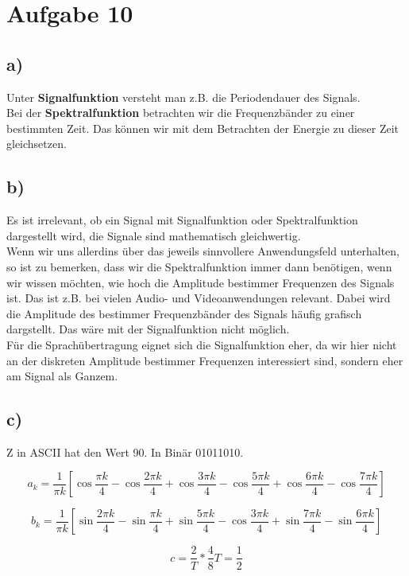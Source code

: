\documentclass[a4paper,12pt]{scrartcl}
\begin{document}
\section{Aufgabe 10}
\subsection{a)}
Unter \textbf{Signalfunktion} versteht man z.B. die
Periodendauer des Signals.\\
Bei der \textbf{Spektralfunktion} betrachten wir
die Frequenzbänder zu einer bestimmten Zeit. Das
können wir mit dem Betrachten der Energie zu dieser
Zeit gleichsetzen.

\subsection{b)}
Es ist irrelevant, ob ein Signal mit Signalfunktion oder Spektralfunktion
dargestellt wird, die Signale sind mathematisch gleichwertig.\\

Wenn wir uns allerdins über das jeweils sinnvollere Anwendungsfeld unterhalten,
so ist zu bemerken, dass wir die Spektralfunktion immer dann benötigen,
wenn wir wissen möchten, wie hoch die Amplitude bestimmer Frequenzen des
Signals ist. Das ist z.B. bei vielen Audio- und Videoanwendungen relevant.
Dabei wird die Amplitude des bestimmer Frequenzbänder des Signals häufig
grafisch dargstellt. Das wäre mit der Signalfunktion nicht möglich.\\

Für die Sprachübertragung eignet sich die Signalfunktion eher, da wir hier
nicht an der diskreten Amplitude bestimmer Frequenzen interessiert sind,
sondern eher am Signal als Ganzem.

\subsection{c)}
Z in ASCII hat den Wert 90. In Binär 01011010.

\[ a_k=\frac{1}{\pi k} \left[\cos \frac{\pi k}{4} - \cos \frac{2 \pi k}{4} +
		\cos \frac{3 \pi k}{4} - \cos \frac{5 \pi k}{4} +
        \cos \frac{6 \pi k}{4} - \cos \frac{7 \pi k}{4} \right] \]

\[ b_k=\frac{1}{\pi k} \left[\sin \frac{2 \pi k}{4} - \sin \frac{\pi k}{4} +
		\sin \frac{5 \pi k}{4} - \cos \frac{3 \pi k}{4} +
        \sin \frac{7 \pi k}{4} - \sin \frac{6 \pi k}{4} \right] \]

\[ c=\frac{2}{T}*\frac{4}{8}T=\frac{1}{2} \]
\end{document}
